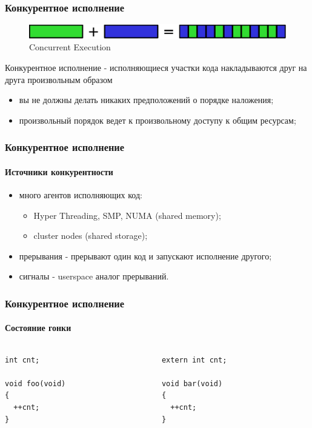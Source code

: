 \begin{frame}
\frametitle{Конкурентное исполнение}
\begin{figure}
  \centering\includegraphics[width=.8\linewidth]{concurrency}
  \caption{Concurrent Execution}
\end{figure}

Конкурентное исполнение - исполняющиеся участки кода накладываются друг на
друга произвольным образом

\begin{itemize}
  \item вы не должны делать никаких предположений о порядке наложения;
  \item произвольный порядок ведет к произвольному доступу к общим ресурсам;
\end{itemize}
\end{frame}

\begin{frame}
\frametitle{Конкурентное исполнение}
\framesubtitle{Источники конкурентности}

\begin{itemize}
  \item<1-> много агентов исполняющих код:
        \begin{itemize}
          \item Hyper Threading, SMP, NUMA (shared memory);
          \item cluster nodes (shared storage);
        \end{itemize}
  \item<2-> прерывания - прерывают один код и запускают исполнение другого;
  \item<3-> сигналы - userspace аналог прерываний.
\end{itemize}
\end{frame}

\begin{frame}[fragile]
\frametitle{Конкурентное исполнение}
\framesubtitle{Состояние гонки}

\begin{columns}[T]
  \begin{column}{.45\linewidth}
    \begin{lstlisting}
int cnt;

void foo(void)
{
  ++cnt;
}
    \end{lstlisting}
  \end{column}
  \begin{column}{.45\linewidth}
    \begin{lstlisting}
extern int cnt;

void bar(void)
{
  ++cnt;
}
    \end{lstlisting}
  \end{column}
\end{columns}
\end{frame}

